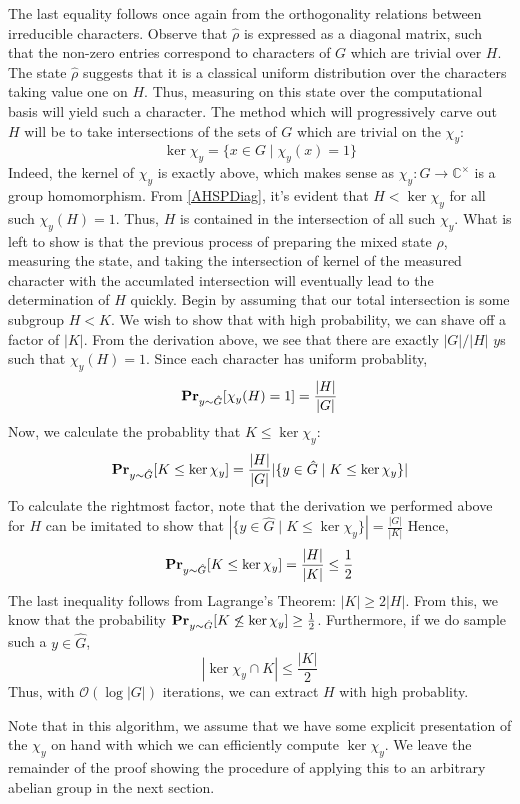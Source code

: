 The last equality follows once again from the orthogonality relations between irreducible characters. Observe that $\hat{\rho}$ is expressed as a diagonal matrix, such that the non-zero entries correspond to characters of $G$ which are trivial over $H$.
%
The state $\hat{\rho}$ suggests that it is a classical uniform distribution over the characters taking value one on $H$. Thus, measuring on this state over the computational basis will yield such a character. The method which will progressively carve out $H$ will be to take intersections of the sets of $G$ which are trivial on the $\chi_y$:
$$ \ker{\chi_{y}} = \{ x \in G \mid \chi_y(x) = 1 \} $$
Indeed, the kernel of $\chi_y$ is exactly above, which makes sense as  $\chi_y: G \rightarrow \mathbb{C}^\times$ is a group homomorphism. From \ref{AHSPDiag}, it's evident that $H < \ker{\chi_y}$ for all such $\chi_y(H) = 1$. Thus, $H$ is contained in the intersection of all such $\chi_y$. What is left to show is that the previous process of preparing the mixed state $\hat{\rho}$, measuring the state, and taking the intersection of kernel of the measured character with the accumlated intersection will eventually lead to the determination of $H$ quickly.
%
Begin by assuming that our total intersection is some subgroup $H < K$. We wish to show that with high probability, we can shave off a factor of $|K|$. From the derivation above, we see that there are exactly $|G|/|H|$ $y$s such that $\chi_y(H) = 1$. Since each character has uniform probablity,
$$ {\bf Pr}_{y \sim \hat{G}}[\chi_y(H) = 1]  = \frac{|H|}{|G|}$$
%
Now, we calculate the probablity that $K \leq \ker{\chi_y}$:
%
\[ {\bf Pr}_{y \sim \hat{G}}[K \leq \ker{\chi_y}] = \frac{|H|}{|G|} |\{y \in \hat{G} \mid K \leq \ker{\chi_y}\}|\]
%
To calculate the rightmost factor, note that the derivation we performed above for $H$ can be imitated to show that $|\{y \in \hat{G} \mid K \leq \ker{\chi_y}\}| = \frac{|G|}{|K|}$
%
Hence,
\[ {\bf Pr}_{y \sim \hat{G}}[K \leq \ker{\chi_y}] = \frac{|H|}{|K|} \leq \frac{1}{2}\]
%
The last inequality follows from Lagrange's Theorem: $|K| \geq 2|H|$. From this, we know that the probability
${\bf Pr}_{y \sim \hat{G}}[K \not\leq \ker{\chi_y}] \geq \frac{1}{2}$. Furthermore, if we do sample such a $y \in \hat{G}$,
\[ |\ker{\chi_y} \cap K| \leq \frac{|K|}{2} \]
Thus, with $\mathcal{O}(\log{|G|})$ iterations, we can extract $H$ with high probablity.

Note that in this algorithm, we assume that we have some explicit presentation of the $\chi_y$ on hand with which we can efficiently compute $\ker{\chi_y}$. We leave the remainder of the proof showing the procedure of applying this to an arbitrary abelian group in the next section.
